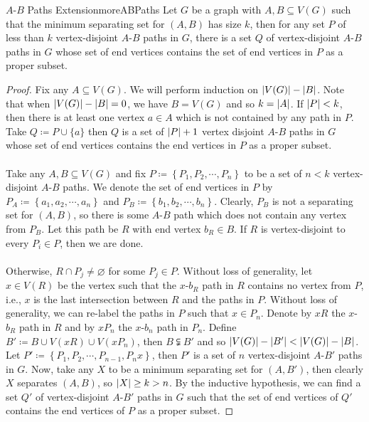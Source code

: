 \documentclass[math, code]{amznotes}
\theoremstyle{remark}
\begin{document}
\begin{lembox}{$A$-$B$ Paths Extension}{moreABPaths}
    Let $G$ be a graph with $A, B \subseteq V(G)$ such that the minimum separating set for $(A, B)$ has size $k$, then for any set $P$ of less than $k$ vertex-disjoint $A$-$B$ paths in $G$, there is a set $Q$ of vertex-disjoint $A$-$B$ paths in $G$ whose set of end vertices contains the set of end vertices in $P$ as a proper subset.
    \tcblower
    \begin{proof}
        Fix any $A \subseteq V(G)$. We will perform induction on ${\left\lvert {V(G)} \right\rvert} - {\left\lvert {B} \right\rvert}$. Note that when ${\left\lvert {V(G)} \right\rvert} - {\left\lvert {B} \right\rvert} = 0$, we have $B = V(G)$ and so $k = {\left\lvert {A} \right\rvert}$. If ${\left\lvert {P} \right\rvert} < k$, then there is at least one vertex $a \in A$ which is not contained by any path in $P$. Take $Q \coloneqq P \cup \{a\}$ then $Q$ is a set of ${\left\lvert {P} \right\rvert} + 1$ vertex disjoint $A$-$B$ paths in $G$ whose set of end vertices contains the end vertices in $P$ as a proper subset.
        \\\\
        Take any $A, B \subseteq V(G)$ and fix $P \coloneqq \left\{P_1, P_2, \cdots, P_n\right\}$ to be a set of $n < k$ vertex-disjoint $A$-$B$ paths. We denote the set of end vertices in $P$ by $P_A \coloneqq \left\{a_1, a_2, \cdots, a_n\right\}$ and $P_B \coloneqq \left\{b_1, b_2, \cdots, b_n\right\}$. Clearly, $P_B$ is not a separating set for $(A, B)$, so there is some $A$-$B$ path which does not contain any vertex from $P_B$. Let this path be $R$ with end vertex $b_R \in B$. If $R$ is vertex-disjoint to every $P_i \in P$, then we are done.
        \\\\
        Otherwise, $R \cap P_j \neq \varnothing$ for some $P_j \in P$. Without loss of generality, let $x \in V(R)$ be the vertex such that the $x$-$b_R$ path in $R$ contains no vertex from $P$, i.e., $x$ is the last intersection between $R$ and the paths in $P$. Without loss of generality, we can re-label the paths in $P$ such that $x \in P_n$. Denote by $xR$ the $x$-$b_R$ path in $R$ and by $xP_n$ the $x$-$b_n$ path in $P_n$. Define $B' \coloneqq B \cup V(xR) \cup V(xP_n)$, then $B \subsetneqq B'$ and so ${\left\lvert {V(G)} \right\rvert} - {\left\lvert {B'} \right\rvert} < {\left\lvert {V(G)} \right\rvert} - {\left\lvert {B} \right\rvert}$. Let $P' \coloneqq \left\{P_1, P_2, \cdots, P_{n - 1}, P_nx\right\}$, then $P'$ is a set of $n$ vertex-disjoint $A$-$B'$ paths in $G$. Now, take any $X$ to be a minimum separating set for $(A, B')$, then clearly $X$ separates $(A, B)$, so ${\left\lvert {X} \right\rvert} \geq k > n$. By the inductive hypothesis, we can find a set $Q'$ of vertex-disjoint $A$-$B'$ paths in $G$ such that the set of end vertices of $Q'$ contains the end vertices of $P$ as a proper subset.

\end{proof}
\end{lembox}
\end{document}
